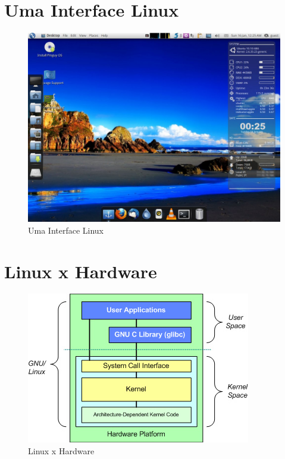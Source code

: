 \documentclass[final,a4paper]{article}
\begin{document}
\section{Uma Interface Linux}


\begin{figure}[!htb]
\centering
\includegraphics[scale=0.25]{figuras/desktop_linux.jpg}
 \caption{Uma Interface Linux}
\end{figure}



\section{Linux x Hardware}

\begin{figure}[!htb]
\centering
\includegraphics[scale=0.9]{figuras/arch_linux.jpg}
\caption{Linux x Hardware}
\end{figure}
\end{document}
